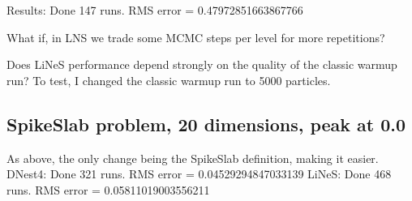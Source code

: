 \documentclass[a4paper, 12pt]{article}
\begin{document}
Results:
Done 147 runs. RMS error = 0.47972851663867766

What if, in LNS we trade some MCMC steps per level
for more repetitions?

Does LiNeS performance depend strongly on the quality of the
classic warmup run? To test, I changed the classic warmup run to 5000
particles.

\subsection{SpikeSlab problem, 20 dimensions, peak at 0.0}
As above, the only change being the SpikeSlab definition, making it
easier.
DNest4: Done 321 runs. RMS error = 0.04529294847033139
LiNeS: Done 468 runs. RMS error = 0.05811019003556211



\begin{thebibliography}{999}
\end{thebibliography}
\end{document}
